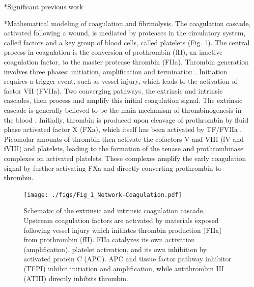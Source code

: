 \documentclass[11pt]{article}
\makeatletter
\renewcommand\subsection{\@startsection
	{subsection}{2}{0mm}
	{-0.05in}
	{-0.5\baselineskip}
	{\normalfont\normalsize\bfseries}}
\renewcommand\section{\@startsection
	{subsection}{2}{0mm}
	{-0.2in}
	{0.05\baselineskip}
	{\normalfont\large\bfseries}}
\makeatother
\begin{document}
\section*{Significant previous work}
\subsection*{Mathematical modeling of coagulation and fibrinolysis.}
The coagulation cascade, activated following a wound,
is mediated by proteases in the circulatory system, called factors and a key group of blood cells, called platelets (Fig. \ref{fig:fig-coagulation}).
The central process in coagulation is the conversion of prothrombin (fII), an inactive coagulation factor, to the master protease thrombin (FIIa).
Thrombin generation involves three phases: initiation, amplification and termination \cite{GOLDHABER2006, Brummel:2002aa}.
Initiation requires a trigger event, such as vessel injury, which leads to the activation of factor VII (FVIIa).
Two converging pathways, the extrinsic and intrinsic cascades, then process and amplify this initial coagulation signal.
The extrinsic cascade is generally believed to be the main mechanism of thrombinogenesis in the blood \cite{MANN1990,ROBERTS1998,MANN1999}.
Initially, thrombin is produced upon cleavage of prothrombin by fluid phase activated factor X (FXa), which itself has been activated by TF/FVIIa \cite{Butenas:2002aa}.
Picomolar amounts of thrombin then activate the cofactors  V and VIII (fV and fVIII) and platelets,
leading to the formation of the tenase and prothrombinase complexes on activated platelets.
These complexes amplify the early coagulation signal by further activating FXa and directly converting prothrombin to thrombin.

\begin{figure}
  \texttt{[image: ./figs/Fig\_1\_Network-Coagulation.pdf]}
  \caption{Schematic of the extrinsic and intrinsic coagulation cascade.
  Upstream coagulation factors are activated by materials exposed following vessel injury which initiates thrombin production (FIIa) from prothrombin (fII).
  FIIa catalyzes its own activation (amplification), platelet activation, and its own inhibition by activated protein C (APC).
  APC and tissue factor pathway inhibitor (TFPI) inhibit initiation and amplification, while antithrombin III (ATIII) directly inhibits thrombin. }\label{fig:fig-coagulation}
\end{figure}

\end{document}
